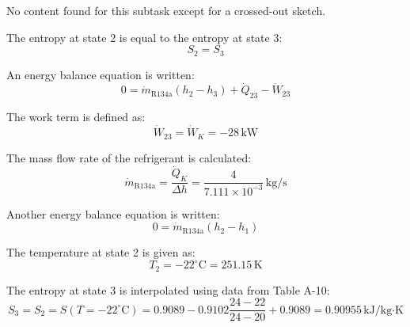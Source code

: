 No content found for this subtask except for a crossed-out sketch.

The entropy at state 2 is equal to the entropy at state 3:  
\[
S_2 = S_3
\]

An energy balance equation is written:  
\[
0 = \dot{m}_{\text{R134a}} \left( h_2 - h_3 \right) + \dot{Q}_{23} - \dot{W}_{23}
\]

The work term is defined as:  
\[
\dot{W}_{23} = \dot{W}_K = -28 \, \text{kW}
\]

The mass flow rate of the refrigerant is calculated:  
\[
\dot{m}_{\text{R134a}} = \frac{\dot{Q}_K}{\Delta h} = \frac{4}{7.111 \times 10^{-3}} \, \text{kg/s}
\]

Another energy balance equation is written:  
\[
0 = \dot{m}_{\text{R134a}} \left( h_2 - h_1 \right)
\]

The temperature at state 2 is given as:  
\[
T_2 = -22^\circ\text{C} = 251.15 \, \text{K}
\]

The entropy at state 3 is interpolated using data from Table A-10:  
\[
S_3 = S_2 = S(T = -22^\circ\text{C}) = 0.9089 - 0.9102 \frac{24 - 22}{24 - 20} + 0.9089 = 0.90955 \, \text{kJ/kg·K}
\]